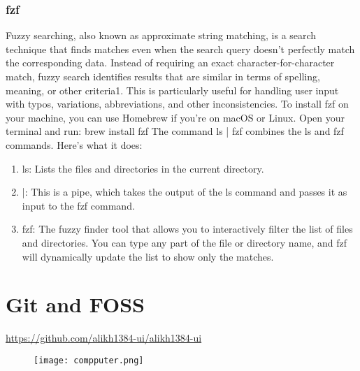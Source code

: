\documentclass{article}
\begin{document}
\subsubsection{fzf}
\textnormal{Fuzzy searching, also known as approximate string matching, is a search technique that finds matches even when the search query doesn't perfectly match the corresponding data. Instead of requiring an exact character-for-character match, fuzzy search identifies results that are similar in terms of spelling, meaning, or other criteria1. This is particularly useful for handling user input with typos, variations, abbreviations, and other inconsistencies.}\newline
\textnormal{To install fzf on your machine, you can use Homebrew if you're on macOS or Linux. Open your terminal and run:}\newline
\textnormal{brew install fzf}\newline
\textnormal{The command ls | fzf combines the ls and fzf commands. Here's what it does:}
\begin{enumerate}
    \item ls: Lists the files and directories in the current directory.
    \item |: This is a pipe, which takes the output of the ls command and passes it as input to the fzf command.
    \item fzf: The fuzzy finder tool that allows you to interactively filter the list of files and directories. You can type any part of the file or directory name, and fzf will dynamically update the list to show only the matches.
\end{enumerate}
\section{Git and FOSS}
\url{https://github.com/alikh1384-ui/alikh1384-ui}
\begin{figure}[h]
    \centering
    \texttt{[image: compputer.png]}
\end{figure}
\end{document}
